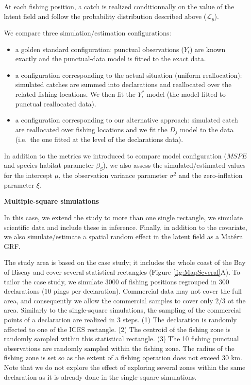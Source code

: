 \documentclass[
  english,
  man,floatsintext]{apa6}
\begin{document}
At each fishing position, a catch is realized conditionnally on the value of the latent field and follow the probability distribution described above (\(\mathcal{L}_y\)).

We compare three simulation/estimation configurations:

\begin{itemize}
\item
  a golden standard configuration: punctual observations (\(Y_i\)) are known exactly and the punctual-data model is fitted to the exact data.
\item
  a configuration corresponding to the actual situation (uniform reallocation): simulated catches are summed into declarations and reallocated over the related fishing locations. We then fit the \(Y_i^*\) model (the model fitted to punctual reallocated data).
\item
  a configuration corresponding to our alternative approach: simulated catch are reallocated over fishing locations and we fit the \(D_j\) model to the data (i.e.~the one fitted at the level of the declarations data).
\end{itemize}

In addition to the metrics we introduced to compare model configuration (\(MSPE\) and species-habitat parameter \(\beta_S\)), we also assess the simulated/estimated values for the intercept \(\mu\), the observation variance parameter \(\sigma^2\) and the zero-inflation parameter \(\xi\).

\textbf{Multiple-square simulations}

In this case, we extend the study to more than one single rectangle, we simulate scientific data and include these in inference. Finally, in addition to the covariate, we also simulate/estimate a spatial random effect in the latent field as a Matérn GRF.

The study area is based on the case study; it includes the whole coast of the Bay of Biscay and cover several statistical rectangles (Figure \ref{fig:MapSeveral}A). To tailor the case study, we simulate 3000 of fishing positions regrouped in 300 declarations (10 pings per declaration). Commercial data may not cover the full area, and consequently we allow the commercial samples to cover only 2/3 ot the area. Similarly to the single-square simulations, the sampling of the commercial points of a declaration are realized in 3 steps. (1) The declaration is randomly affected to one of the ICES rectangle. (2) The centroid of the fishing zone is randomly sampled within this statistical rectangle. (3) The 10 fishing punctual observations are randomly sampled within the fishing zone. The radius of the fishing zone is set so as the extent of a fishing operation does not exceed 30 km. Note that we do not explore the effect of exploring several zones within the same declaration as it is already done in the single-square simulations.
\end{document}
